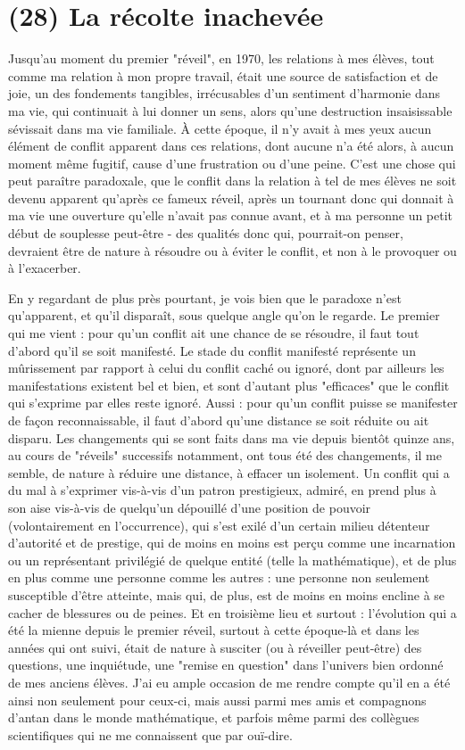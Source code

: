 \section{(28) La récolte inachevée}

Jusqu'au moment du premier "réveil", en 1970, les relations à mes élèves, tout comme ma relation à mon propre travail, était une source de satisfaction et de joie, un des fondements tangibles, irrécusables d'un sentiment d'harmonie dans ma vie, qui continuait à lui donner un sens, alors qu'une destruction insaisissable sévissait dans ma vie familiale. À cette époque, il n'y avait à mes yeux aucun élément de conflit apparent dans ces relations, dont aucune n'a été alors, à aucun moment même fugitif, cause d'une frustration ou d'une peine. C'est une chose qui peut paraître paradoxale, que le conflit dans la relation à tel de mes élèves ne soit devenu apparent qu'après ce fameux réveil, après un tournant donc qui donnait à ma vie une ouverture qu'elle n'avait pas connue avant, et à ma personne un petit début de souplesse peut-être - des qualités donc qui, pourrait-on penser, devraient être de nature à résoudre ou à éviter le conflit, et non à le provoquer ou à l'exacerber.

En y regardant de plus près pourtant, je vois bien que le paradoxe n'est qu'apparent, et qu'il disparaît, sous quelque angle qu'on le regarde. Le premier qui me vient : pour qu'un conflit ait une chance de se résoudre, il faut tout d'abord qu'il se soit manifesté. Le stade du conflit manifesté représente un mûrissement par rapport à celui du conflit caché ou ignoré, dont par ailleurs les manifestations existent bel et bien, et sont d'autant plus "efficaces" que le conflit qui s'exprime par elles reste ignoré. Aussi : pour qu'un conflit puisse se manifester de façon reconnaissable, il faut d'abord qu'une distance se soit réduite ou ait disparu. Les changements qui se sont faits dans ma vie depuis bientôt quinze ans, au cours de "réveils" successifs notamment, ont tous été des changements, il me semble, de nature à réduire une distance, à effacer un isolement. Un conflit qui a du mal à s'exprimer vis-à-vis d'un patron prestigieux, admiré, en prend plus à son aise vis-à-vis de quelqu'un dépouillé d'une position de pouvoir (volontairement en l'occurrence), qui s'est exilé d'un certain milieu détenteur d'autorité et de prestige, qui de moins en moins est perçu comme une incarnation ou un représentant privilégié de quelque entité (telle la mathématique), et de plus en plus comme une personne comme les autres : une personne non seulement susceptible d'être atteinte, mais qui, de plus, est de moins en moins encline à se cacher de blessures ou de peines. Et en troisième lieu et surtout : l'évolution qui a été la mienne depuis le premier réveil, surtout à cette époque-là et dans les années qui ont suivi, était de nature à susciter (ou à réveiller peut-être) des questions, une inquiétude, une "remise en question" dans l'univers bien ordonné de mes anciens élèves. J'ai eu ample occasion de me rendre compte qu'il en a été ainsi non seulement pour ceux-ci, mais aussi parmi mes amis et compagnons d'antan dans le monde mathématique, et parfois même parmi des collègues scientifiques qui ne me connaissent que par ouï-dire.

